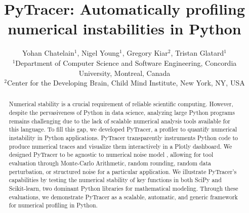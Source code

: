 \documentclass[11pt]{article}
\newcommand{\tristan}[1]{\color{orange}\textbf{From Tristan:} #1\color{black}\xspace}
\newcommand{\pytracer}[0]{PyTracer\xspace}
\begin{document}
\makeatletter
\let\orig@lstnumber=\thelstnumber
\newcommand\lstsetnumber[1]{\gdef\thelstnumber{#1}}
\newcommand\lstresetnumber{\global\let\thelstnumber=\orig@lstnumber}
\makeatother

\title{PyTracer: Automatically profiling numerical instabilities in Python}
\author{Yohan Chatelain$^1$, Nigel Young$^1$,  Gregory Kiar$^2$,  Tristan Glatard$^1$\\
$^1$Department of Computer Science and Software Engineering, Concordia University, Montreal, Canada\\
$^2$Center for the Developing Brain, Child Mind Institute, New York, NY, USA}
    \date{}
\maketitle

\begin{abstract}
Numerical stability is a crucial requirement of reliable scientific computing. However, despite the pervasiveness of Python in data science, analyzing large Python programs remains challenging due to the lack of scalable numerical analysis tools available for this language. To fill this gap, we developed \pytracer, a profiler to quantify numerical instability in Python applications. \pytracer transparently instruments Python code to produce numerical traces and visualize them interactively in a Plotly dashboard. We designed \pytracer to be agnostic to numerical noise model , allowing for tool evaluation through Monte-Carlo Arithmetic, random rounding, random data perturbation, or structured noise for a particular application. We illustrate \pytracer's capabilities by testing the numerical stability of key functions in both SciPy and Scikit-learn, two dominant Python libraries for mathematical modeling. Through these evaluations, we demonstrate \pytracer as a scalable, automatic, and generic framework for numerical profiling in Python.
\end{abstract}
\end{document}

